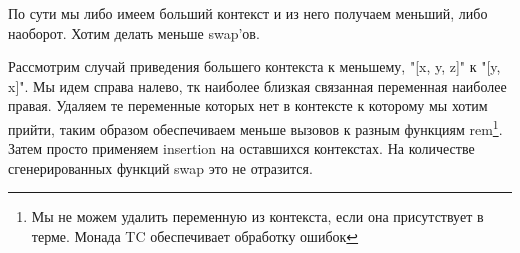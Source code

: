 По сути мы либо имеем больший контекст и из него получаем меньший, либо наоборот. Хотим делать меньше swap'ов.

Рассмотрим случай приведения большего контекста к меньшему, "[x, y, z]" к "[y, x]". Мы идем справа налево, тк наиболее близкая связанная переменная наиболее правая. Удаляем те переменные которых нет в контексте к которому мы хотим прийти, таким образом обеспечиваем меньше вызовов к разным функциям rem\footnote{Мы не можем удалить переменную из контекста, если она присутствует в терме. Монада TC обеспечивает обработку ошибок}. Затем просто применяем insertion на оставшихся контекстах. На количестве сгенерированных функций swap это не отразится.







